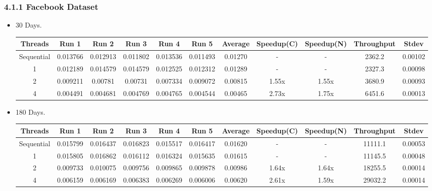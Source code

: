\documentclass{article}
\begin{document}
\subsubsection*{4.1.1 Facebook Dataset}
    \begin{itemize}
    \item 30 Days.
    \begin{center}
    \begin{adjustbox}{width=\columnwidth,center}
    \begin{tabular}{||c | c c c c c | c | c c | c c ||} 
    \hline
    Threads & Run 1 & Run 2 & Run 3 & Run 4 & Run 5 & Average & Speedup(C) & Speedup(N) & Throughput & Stdev \\ [0.5ex] 
    \hline\hline
    Sequential & 0.013766 & 0.012913 & 0.011802 & 0.013536 & 0.011493 & 0.01270 & - & - & 2362.2 &  0.00102\\ 
    \hline
    1 & 0.012189 & 0.014579 & 0.014579 & 0.012525 & 0.012312 & 0.01289  & - & - & 2327.3 & 0.00098\\ 
    \hline
    2 & 0.009211 & 0.00781 & 0.00731 & 0.007334 & 0.009072 & 0.00815 & 1.55x & 1.55x & 3680.9 & 0.00093\\ 
    \hline
    4 & 0.004491 & 0.004681 & 0.004769 & 0.004765 & 0.004544 & 0.00465 & 2.73x & 1.75x & 6451.6 & 0.00013\\ 
    \hline
    \end{tabular}
    \end{adjustbox}
    \end{center}
    
    \item 180 Days.
   \begin{center}
    \begin{adjustbox}{width=\columnwidth,center}
    \begin{tabular}{||c | c c c c c | c | c c | c c ||} 
    \hline
    Threads & Run 1 & Run 2 & Run 3 & Run 4 & Run 5 & Average & Speedup(C) & Speedup(N) & Throughput & Stdev \\ [0.5ex] 
    \hline\hline
    Sequential & 0.015799 & 0.016437 & 0.016823 & 0.015517 & 0.016417 & 0.01620 
    & - & - & 11111.1  & 0.00053\\ 
    \hline
    1 & 0.015805 & 0.016862 & 0.016112 & 0.016324 & 0.015635 & 0.01615 & - & - & 11145.5 & 0.00048\\ 
    \hline
    2 & 0.009733 & 0.010075 & 0.009756 & 0.009865 & 0.009878 & 0.00986 & 1.64x & 1.64x & 18255.5 & 0.00014\\ 
    \hline
    4 & 0.006159 & 0.006169 & 0.006383 & 0.006269 & 0.006006 & 0.00620 & 2.61x & 1.59x & 29032.2 & 0.00014\\ 
    \hline
    \end{tabular}
    \end{adjustbox}
    \end{center}
    

\end{itemize}
\end{document}
